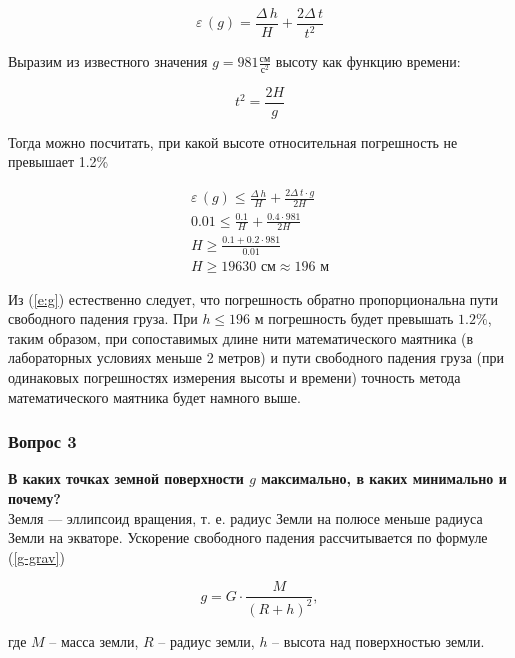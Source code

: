 \documentclass[a4paper,12pt]{article}
\begin{document}
		\begin{equation}
			\varepsilon\,(g)=\frac{\Delta\,h}{H}+\frac{2\Delta\,t}{t^2}
		\end{equation}		

		Выразим из известного значения $g=981\frac{\text{см}}{\text{с}^2}$ высоту как функцию времени:

		\begin{equation}
			t^2=\frac{2H}{g}
		\end{equation}		

		Тогда можно посчитать, при какой высоте относительная погрешность не превышает 1.2\%

		\begin{eqnarray}
		\label{e:g}
			\varepsilon\,(g)\le\frac{\Delta\,h}{H}+\frac{2\Delta\,t\cdot{}g}{2H}\\
			0.01\le\frac{0.1}{H}+\frac{0.4\cdot981}{2H}\\
			H\ge\frac{0.1+0.2\cdot981}{0.01}\\
			H\ge19630\text{ см}\approx196\text{ м}
		\end{eqnarray}	

		Из (\ref{e:g}) естественно следует, что погрешность обратно пропорциональна пути свободного падения груза. При $h\le196\text{ м}$ погрешность будет превышать $1.2\%$, таким образом, при сопоставимых длине нити математического маятника (в лабораторных условиях меньше 2 метров) и пути свободного падения груза (при одинаковых погрешностях измерения высоты и времени) точность метода математического маятника будет намного выше.



\subsubsection{Вопрос 3}

\textbf{В каких точках земной поверхности $g$ максимально, в каких минимально и почему?}
\\

		Земля --- эллипсоид вращения, т. е. радиус Земли на полюсе меньше радиуса Земли на экваторе. Ускорение свободного падения рассчитывается по формуле (\ref{g-grav})

		\begin{equation}
		\label{g-grav}
			g=G\cdot\frac{M}{(R+h)^2}, 
		\end{equation}

		где $M$ -- масса земли, $R$ -- радиус земли, $h$ -- высота над поверхностью земли.
\end{document}
